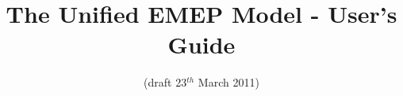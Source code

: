\documentclass[a4paper,12pt]{report}
\begin{document}

\title{The Unified EMEP Model - User's Guide}
\date{(draft 23$^{th}$ March 2011)}
\maketitle

\tableofcontents








%
%
%
%
%
%
%
%
%
%
%
%

\end{document}
